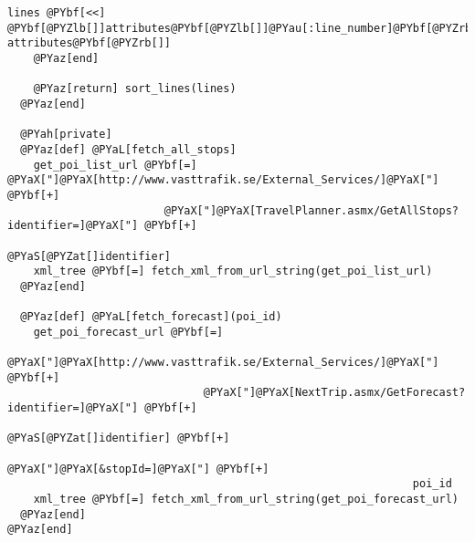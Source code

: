 \begin{Verbatim}[commandchars=@\[\]]
      lines @PYbf[<<] @PYbf[@PYZlb[]]attributes@PYbf[@PYZlb[]]@PYau[:line_number]@PYbf[@PYZrb[]], attributes@PYbf[@PYZrb[]]
    @PYaz[end]

    @PYaz[return] sort_lines(lines)
  @PYaz[end]

  @PYah[private]
  @PYaz[def] @PYaL[fetch_all_stops]
    get_poi_list_url @PYbf[=] @PYaX["]@PYaX[http://www.vasttrafik.se/External_Services/]@PYaX["] @PYbf[+] 
                        @PYaX["]@PYaX[TravelPlanner.asmx/GetAllStops?identifier=]@PYaX["] @PYbf[+]
                                                        @PYaS[@PYZat[]identifier]
    xml_tree @PYbf[=] fetch_xml_from_url_string(get_poi_list_url)
  @PYaz[end]

  @PYaz[def] @PYaL[fetch_forecast](poi_id)
    get_poi_forecast_url @PYbf[=]
                        @PYaX["]@PYaX[http://www.vasttrafik.se/External_Services/]@PYaX["] @PYbf[+]
                              @PYaX["]@PYaX[NextTrip.asmx/GetForecast?identifier=]@PYaX["] @PYbf[+]
                                                          @PYaS[@PYZat[]identifier] @PYbf[+]
                                                           @PYaX["]@PYaX[&stopId=]@PYaX["] @PYbf[+]
                                                              poi_id
    xml_tree @PYbf[=] fetch_xml_from_url_string(get_poi_forecast_url)
  @PYaz[end]
@PYaz[end]
\end{Verbatim}
